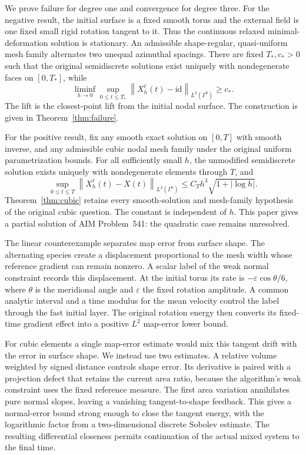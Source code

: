 \documentclass[11pt,a4paper]{article}
\numberwithin{equation}{section}
\theoremstyle{remark}
\newcommand{\id}{\mathrm{id}}
\newcommand{\norm}[1]{\left\lVert #1\right\rVert}
\begin{document}
We prove failure for degree one and convergence for degree three.
For the negative result, the initial surface is a fixed smooth torus
and the external field is one fixed small rigid rotation tangent to it.
Thus the continuous relaxed minimal-deformation solution is stationary.
An admissible shape-regular, quasi-uniform mesh family alternates two
unequal azimuthal spacings. There are fixed \(T_*,c_*>0\) such that
the original semidiscrete solutions exist uniquely with nondegenerate
faces on \([0,T_*]\), while
\[
 \liminf_{h\to0}\sup_{0\leq t\leq T_*}
           \norm{X_h^\ell(t)-\id}_{L^2(\Gamma^0)}\geq c_* .
\]
The lift is the closest-point lift from the initial nodal surface.
The construction is given in Theorem~\ref{thm:failure}.

For the positive result, fix any smooth exact solution on \([0,T]\)
with smooth inverse, and any admissible cubic nodal mesh family under
the original uniform parametrization bounds. For all sufficiently
small \(h\), the unmodified semidiscrete solution exists uniquely
with nondegenerate elements through \(T\), and
\[
 \sup_{0\leq t\leq T}\norm{X_h^\ell(t)-X(t)}_{L^2(\Gamma^0)}
          \leq C_T h^3\sqrt{1+|\log h|}.
\]
Theorem~\ref{thm:cubic} retains every smooth-solution and mesh-family
hypothesis of the original cubic question. The constant is independent
of \(h\). This paper gives a partial solution of AIM Problem~541:
the quadratic case remains unresolved.

The linear counterexample separates map error from surface shape.
The alternating species create a displacement proportional to the mesh
width whose reference gradient can remain nonzero. A scalar label
of the weak normal constraint records this displacement. At the initial
torus its rate is \(-\varepsilon\cos\theta/6\), where \(\theta\) is
the meridional angle and \(\varepsilon\) the fixed rotation amplitude.
A common analytic interval and a time modulus for the mean velocity
control the label through the fast initial layer. The original rotation
energy then converts its fixed-time gradient effect into a positive
\(L^2\) map-error lower bound.

For cubic elements a single map-error estimate would mix this tangent
drift with the error in surface shape. We instead use two estimates.
A relative volume weighted by signed distance controls shape error.
Its derivative is paired with a projection defect that retains the
current area ratio, because the algorithm's weak constraint uses the
fixed reference measure. The first area variation annihilates pure
normal slopes, leaving a vanishing tangent-to-shape feedback.
This gives a normal-error bound strong enough to close the tangent
energy, with the logarithmic factor from a two-dimensional discrete
Sobolev estimate. The resulting differential closeness permits
continuation of the actual mixed system to the final time.
\end{document}
